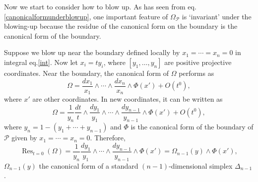 \documentclass[12pt]{article}
\theoremstyle{definition}
\theoremstyle{plain}
\begin{document}
Now we start to consider how to blow up. As has seen from eq.\eqref{canonicalformunderblowup}, one important feature of $\Omega_{\mathcal P}$ is `invariant' under the blowing-up because the residue of the canonical form on the boundary is the canonical form of the boundary.

Suppose we blow up near the boundary defined locally by $x_1=\cdots=x_n=0$ in integral eq.\eqref{int}. Now let $x_i=ty_i$, where $[y_1,\dots,y_n]$ are positive projective coordinates. Near the boundary, the canonical form of $\Omega$ performs as 
\[
	\Omega=\frac{dx_1}{x_1}\wedge \cdots\wedge\frac{dx_n}{x_n}
	\wedge \Phi(x')+O(t^0),
\]
where $x'$ are other coordinates. In new coordinates, it can be written as 
\[
	\Omega=\frac{1}{y_n}\frac{dt}{t}\wedge \frac{dy_1}{y_1}\wedge \cdots\wedge\frac{dy_{n-1}}{y_{n-1}}\wedge \Phi(x')+O(t^0),
\]
where $y_n=1-(y_1+\cdots+y_{n-1})$ and $\Phi$ is the canonical form of the boundary of $\mathcal P$ given by $x_1=\cdots=x_n=0$. Therefore,
\[
	\operatorname{Res}_{t=0}(\Omega)=\frac{1}{y_n}\frac{dy_1}{y_1}\wedge \cdots\wedge\frac{dy_{n-1}}{y_{n-1}}\wedge \Phi(x')=\Omega_{n-1}(y)\wedge \Phi(x'),
\]
$\Omega_{n-1}(y)$ the canonical form of a standard $(n-1)$-dimensional simplex $\Delta_{n-1}$. 



\end{document}

